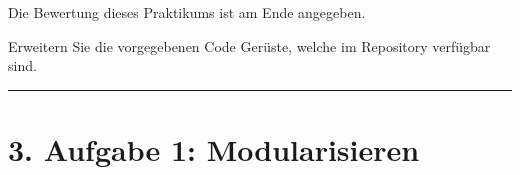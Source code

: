 \documentclass[a4paper,10pt,english]{report}
\begin{document}
\sphinxAtStartPar
Die Bewertung dieses Praktikums ist am Ende angegeben.

\sphinxAtStartPar
Erweitern Sie die vorgegebenen Code Gerüste, welche im  Repository  verfügbar sind.


\bigskip\hrule\bigskip



\section{3. Aufgabe 1: Modularisieren}
\label{\detokenize{P04_Modularisieren_von_C_Code/new_P04/P04_Modularisieren_von_C_Code:aufgabe-1-modularisieren}}
\sphinxAtStartPar
{}
\end{document}
